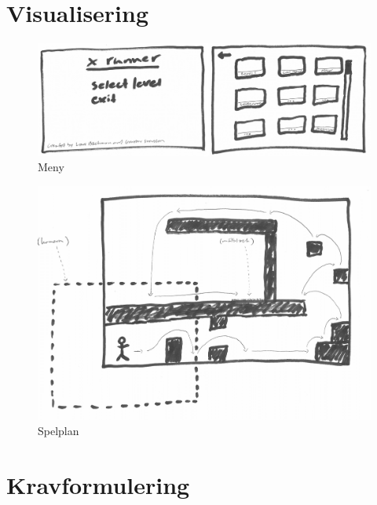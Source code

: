 \documentclass{TDP003mall}
\begin{document}
\section{Visualisering}
\begin{figure}[!h]
  \centering
  \includegraphics[scale=0.20]{startmeny}
  \caption{Meny}
  \label{Meny}
\end{figure}



\begin{figure}[!h]
  \centering
  \includegraphics[scale=0.20]{spelplan}
  \caption{Spelplan}
  \label{Spelplan}
\end{figure}
\newpage
\section{Kravformulering}
\end{document}
